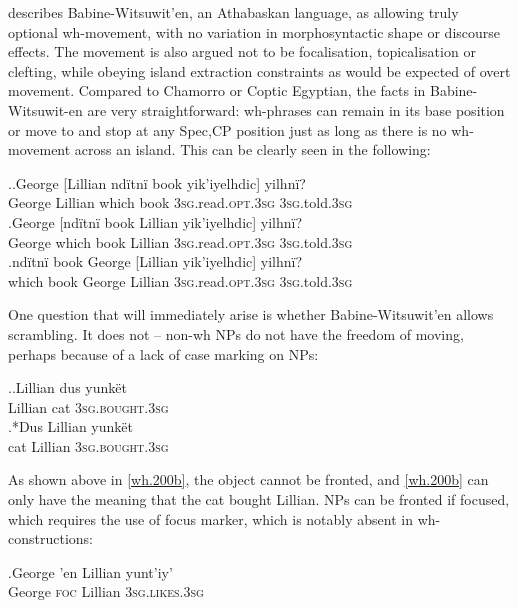 \documentclass[11pt]{article}
\begin{document}
\cite{denham:1997, denham:00} describes Babine-Witsuwit'en, an Athabaskan language, as allowing truly optional wh-movement, with no variation in morphosyntactic shape or discourse effects. The movement is also argued not to be focalisation, topicalisation or clefting, while obeying island extraction constraints as would be expected of overt movement. Compared to Chamorro or Coptic Egyptian, the facts in Babine-Witsuwit-en are very straightforward: wh-phrases can remain in its base position or move to and stop at any Spec,CP position just as long as there is no wh-movement across an island. This can be clearly seen in the following:

\ex.\ag.\label{wh.190a}George [Lillian nd\"itn\"i book yik'iyelhdic] yilhn\"i?\\
   George Lillian which book \textsc{3sg}.read.\textsc{opt.3sg} \textsc{3sg}.told.\textsc{3sg}\\
   \bg.\label{wh.190b}George [nd\"itn\"i book Lillian yik'iyelhdic] yilhn\"i?\\
   George which book Lillian \textsc{3sg}.read.\textsc{opt.3sg} \textsc{3sg}.told.\textsc{3sg}\\
   \bg.\label{wh.190c}nd\"itn\"i book George [Lillian yik'iyelhdic] yilhn\"i?\\
   which book George Lillian \textsc{3sg}.read.\textsc{opt.3sg} \textsc{3sg}.told.\textsc{3sg}\\

One question that will immediately arise is whether Babine-Witsuwit'en allows scrambling. It does not -- non-wh NPs do not have the freedom of moving, perhaps because of a lack of case marking on NPs:

\ex.\ag.\label{wh.200a}Lillian dus yunk\"et\\
   Lillian cat \textsc{3sg.bought.3sg}\\
   \bg.*\label{wh.200b}Dus Lillian yunk\"et\\
   cat Lillian \textsc{3sg.bought.3sg}\\

As shown above in \ref{wh.200b}, the object cannot be fronted, and \ref{wh.200b} can only have the meaning that the cat bought Lillian. NPs can be fronted if focused, which requires the use of focus marker, which is notably absent in wh-constructions:

\exg.\label{wh.210}George 'en Lillian yunt'iy'\\
   George \textsc{foc} Lillian \textsc{3sg.likes.3sg}\\
\end{document}
